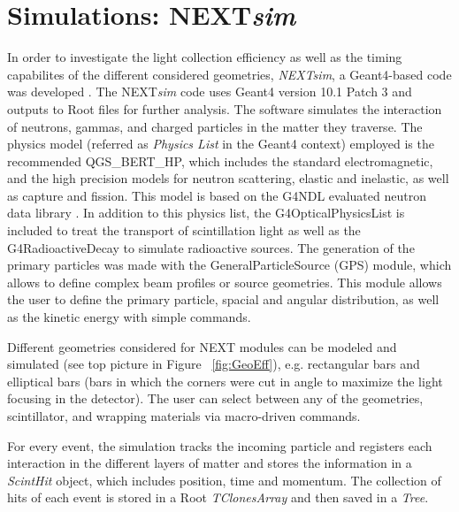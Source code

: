 
\section{Simulations: NEXT\emph{sim}}
\begin{comment}
\begin{figure*}[htp]
 \centering
  \texttt{[image: Figures/Geometries.eps]}
  \caption{Visualization of a 1 Mev neutron event in NEXT\emph{sim} for two geometries considered for a NEXT layer. Green lines correspond to optical photons produced in the sctintillation.}
  \label{fig:Geometries}
\end{figure*} 
\end{comment}

In order to investigate the light collection efficiency as well as the timing capabilites of the different considered geometries, \emph{NEXTsim}, a {\sc Geant4}-based code was developed \cite{AGOSTINELLI2003250,ALLISON2016186}. The NEXT\textit{sim} code uses  {\sc Geant4} version 10.1 Patch 3 and outputs to {\sc Root} files for further analysis.
The software simulates the interaction of neutrons, gammas, and charged particles in the matter they traverse. The  physics model (referred as \emph{Physics List} in the {\sc Geant4} context) employed is the recommended QGS\_BERT\_HP, which includes the standard electromagnetic, and the high precision models for neutron scattering, elastic and inelastic, as well as capture and fission.  This model is based on the G4NDL evaluated neutron data library \cite{Apostolakis2009}. In addition to this physics list, the G4OpticalPhysicsList is included to treat the transport of scintillation light as well as the G4RadioactiveDecay to simulate radioactive sources. The generation of the primary particles  was made with the GeneralParticleSource (GPS) module, which allows to define complex beam profiles or source geometries. This module allows the user to define the primary particle, spacial and angular distribution, as well as the kinetic energy with simple commands.
 
 Different geometries considered for NEXT modules can be modeled and simulated (see top picture in Figure ~\ref{fig:GeoEff}), e.g. rectangular bars and elliptical bars (bars in which the corners were cut in angle to maximize the light focusing in the detector). The user can select between any of the geometries, scintillator, and wrapping materials via macro-driven commands.

For every event, the simulation tracks the incoming particle and registers each interaction in the different layers of matter and stores the information in a \emph{ScintHit} object, which includes position, time and momentum. The collection of hits of each event is stored in a  {\sc Root} \emph{TClonesArray} and then saved in a \emph{Tree}.

